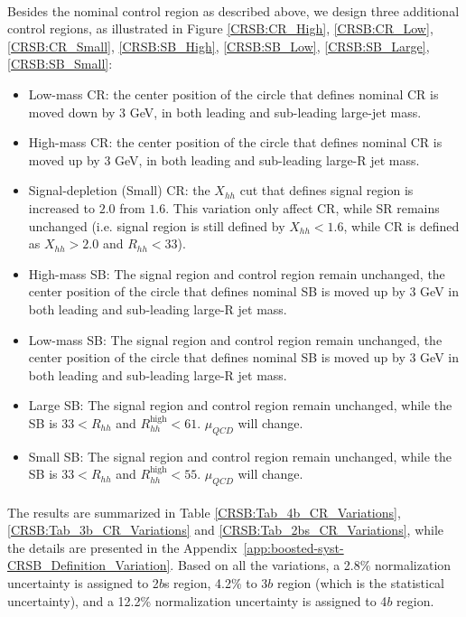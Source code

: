 \paragraph{}
Besides the nominal control region as described above, we design three additional control regions, as illustrated in Figure \ref{CRSB:CR_High}, \ref{CRSB:CR_Low}, \ref{CRSB:CR_Small}, \ref{CRSB:SB_High}, \ref{CRSB:SB_Low}, \ref{CRSB:SB_Large}, \ref{CRSB:SB_Small}:
\begin{itemize}
	\item Low-mass CR: the center position of the circle that defines nominal CR is moved down by 3 GeV, in both leading and sub-leading large-jet mass.
	\item High-mass CR: the center position of the circle that defines nominal CR is moved up by 3 GeV, in both leading and sub-leading large-R jet mass.
	\item Signal-depletion (Small) CR: the $X_{hh}$ cut that defines signal region is increased to $2.0$ from $1.6$. This variation only affect CR, while SR remains unchanged (i.e. signal region is still defined by $X_{hh}<1.6$, while CR is defined as $X_{hh}>2.0$ and $R_{hh}<33$).
	\item High-mass SB: The signal region and control region remain unchanged, the center position of the circle that defines nominal SB is moved up by 3 GeV in both leading and sub-leading large-R jet mass.
	\item Low-mass SB: The signal region and control region remain unchanged, the center position of the circle that defines nominal SB is moved up by 3 GeV in both leading and sub-leading large-R jet mass.
	\item Large SB: The signal region and control region remain unchanged, while the SB is $33 < R_{hh}$ and $ R_{hh}^{\text{high}} < 61$. $\mu_{QCD}$ will change.
	\item Small SB: The signal region and control region remain unchanged, while the SB is $33 < R_{hh}$ and $ R_{hh}^{\text{high}} < 55$. $\mu_{QCD}$ will change.
\end{itemize}

\paragraph{}
The results are summarized in Table \ref{CRSB:Tab_4b_CR_Variations}, \ref{CRSB:Tab_3b_CR_Variations} and \ref{CRSB:Tab_2bs_CR_Variations}, while the details are presented in the Appendix~\ref{app:boosted-syst-CRSB_Definition_Variation}. Based on all the variations, a 2.8\% normalization uncertainty is assigned to 2$b$s region, 4.2\% to 3$b$ region (which is the statistical uncertainty), and a 12.2\% normalization uncertainty is assigned to 4$b$ region.

